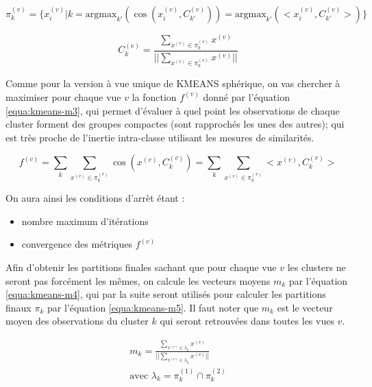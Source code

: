 \documentclass[12pt, french, latin.medieval, a4paper]{report}
\begin{document}
        \begin{equation}
            \pi_{k}^{(v)} = \{ x_{i}^{(v)} | k = \text{argmax}_{k'}(\cos(x_{i}^{(v)} ,C_{k'}^{(v)})) =  \text{argmax}_{k'}(< x_{i}^{(v)} ,C_{k'}^{(v)}>) \}
            \label{equa:kmeans-m1} 
        \end{equation}

        \begin{equation}
            C_{k}^{(v)} = \frac{ \sum_{ x^{(v)} \in \pi_{k}^{(v)} } x^{(v)} }{ || \sum_{ x^{(v)} \in \pi_{k}^{(v)} } x^{(v)} || }
            \label{equa:kmeans-m2} 
        \end{equation}

         Comme pour la version à vue unique de KMEANS sphérique, on vas chercher à maximiser pour chaque vue $v$ la fonction $f^{(v)}$ donné par l'équation \ref{equa:kmeans-m3}, qui permet d'évaluer à quel point les observations de chaque cluster forment des groupes compactes (sont rapprochés les unes des autres); qui est très proche de l'inertie intra-classe utilisant les mesures de similarités.
         
        \begin{equation}
             f^{(v)} = \sum_k \sum_{ x^{(v)} \in \pi_{k}^{(v)} } \cos(x^{(v)}, C_{k}^{(v)}) = \sum_k \sum_{ x^{(v)} \in \pi_{k}^{(v)} } <x^{(v)}, C_{k}^{(v)}>
            \label{equa:kmeans-m3} 
        \end{equation}

        On aura ainsi les conditions d'arrèt étant : 
        \begin{itemize}
            \item nombre maximum d'itérations
            \item convergence des métriques $f^{(v)}$
        \end{itemize}
        
        Afin d'obtenir les partitions finales sachant que pour chaque vue $v$ les clusters ne seront pas forcément les mêmes, on calcule les vecteurs moyens $m_{k}$ par l'équation \ref{equa:kmeans-m4}, qui par la suite seront utilisés pour calculer les partitions finaux $\pi_k$ par l'équation \ref{equa:kmeans-m5}. Il faut noter que $m_k$ est le vecteur moyen des observations du cluster $k$ qui seront retrouvées dans toutes les vues $v$.

        \begin{equation}
            \begin{aligned}
                m_{k} = \frac{ \sum_{ x^{(v)} \in \lambda_k } x^{(v)} }{ || \sum_{ x^{(v)} \in \lambda_k } x^{(v)} || } \\
                \text{avec } \lambda_k = \pi_{k}^{(1)} \cap \pi_{k}^{(2)}  
            \end{aligned}
            \label{equa:kmeans-m4} 
        \end{equation}
\end{document}
